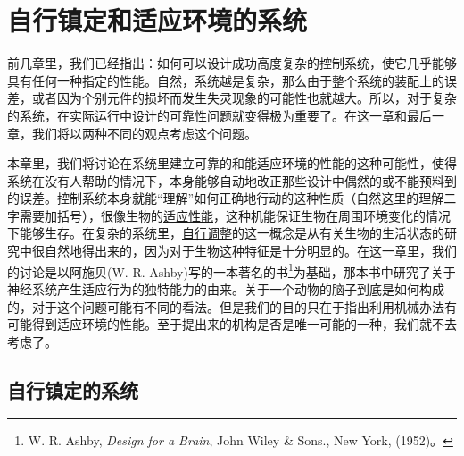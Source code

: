 \chapter{自行镇定和适应环境的系统}

前几章里，我们已经指出：如何可以设计成功高度复杂的控制系统，使它几乎能够具有任何一种指定的性能。自然，系统越是复杂，那么由于整个系统的装配上的误差，或者因为个别元件的损坏而发生失灵现象的可能性也就越大。所以，对于复杂的系统，在实际运行中设计的可靠性问题就变得极为重要了。在这一章和最后一章，我们将以两种不同的观点考虑这个问题。

本章里，我们将讨论在系统里建立可靠的和能适应环境的性能的这种可能性，使得系统在没有人帮助的情况下，本身能够自动地改正那些设计中偶然的或不能预料到的误差。控制系统本身就能“理解”如何正确地行动的这种性质（自然这里的理解二字需要加括号），很像生物的\underline{适应性能}，这种机能保证生物在周围环境变化的情况下能够生存。在复杂的系统里，\underline{自行调整}的这一概念是从有关生物的生活状态的研究中很自然地得出来的，因为对于生物这种特征是十分明显的。在这一章里，我们的讨论是以阿施贝(W. R. Ashby)写的一本著名的书\footnote{W. R. Ashby, \textit{Design for a Brain}, John Wiley \& Sons., New York, (1952)。}为基础，那本书中研究了关于神经系统产生适应行为的独特能力的由来。关于一个动物的脑子到底是如何构成的，对于这个问题可能有不同的看法。但是我们的目的只在于指出利用机械办法有可能得到适应环境的性能。至于提出来的机构是否是唯一可能的一种，我们就不去考虑了。


\section{自行镇定的系统}

